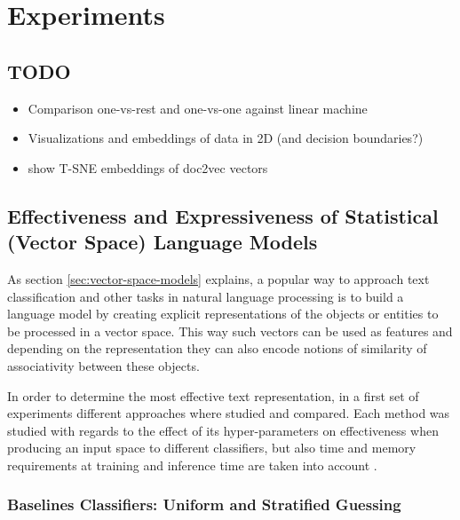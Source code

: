 
\clearpage
\section{Experiments}

\subsection{TODO}

\begin{itemize}
  \item Comparison one-vs-rest and one-vs-one against linear machine
  \item Visualizations and embeddings of data in 2D (and decision boundaries?)
  \item show T-SNE embeddings of doc2vec vectors
\end{itemize}

\subsection{Effectiveness and Expressiveness of Statistical (Vector Space) Language Models}


As section \ref{sec:vector-space-models} explains, a popular way to approach text classification and other tasks in natural language processing is to build a language model by creating explicit representations of the objects or entities to be processed in a vector space. This way such vectors can be used as features and depending on the representation they can also encode notions of similarity of associativity between these objects.

In order to determine the most effective text representation, in a first set of experiments different approaches where studied and compared. Each method was studied with regards to the effect of its hyper-parameters on effectiveness when producing an input space to different classifiers, but also time and memory requirements at training and inference time are taken into account .

\subsubsection{Baselines Classifiers: Uniform and Stratified Guessing}
\label{subs:baselines-classifiers}

